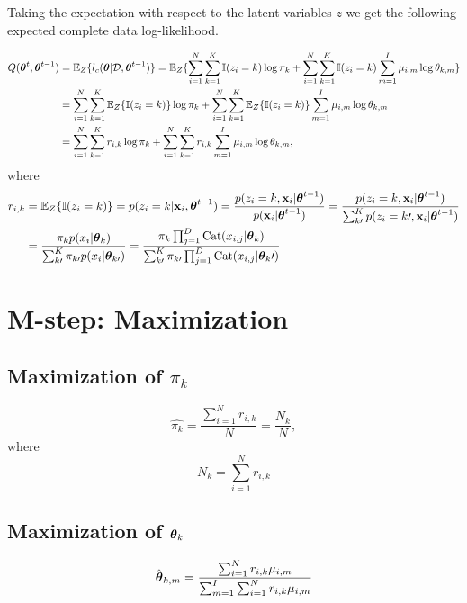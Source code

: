 \documentclass[12pt]{article}
\begin{document}
Taking the expectation with respect to the latent variables $z$ we get the following expected complete data log-likelihood.

\begin{align}
    Q(\boldsymbol\theta^t, \boldsymbol\theta^{t-1}) & = \mathbb{E}_Z\{l_c(\boldsymbol\theta|\mathcal{D},\boldsymbol\theta^{t-1})\} = \mathbb{E}_Z\{\sum_{i=1}^N\sum_{k=1}^K\mathbb{I} (z_i=k) \log \pi_k + \sum_{i=1}^N\sum_{k=1}^K\mathbb{I} (z_i=k) \sum_{m=1}^I \mu_{i,m}\log \theta_{k,m}\}\\
    & = \sum_{i=1}^N\sum_{k=1}^K\mathbb{E}_Z\{\mathbb{I} (z_i=k)\} \log \pi_k + \sum_{i=1}^N\sum_{k=1}^K\mathbb{E}_Z\{\mathbb{I}(z_i=k)\} \sum_{m=1}^I \mu_{i,m}\log \theta_{k,m}\\
    & = \sum_{i=1}^N\sum_{k=1}^K r_{i,k}\log \pi_k + \sum_{i=1}^N\sum_{k=1}^K r_{i,k}\sum_{m=1}^I \mu_{i,m}\log \theta_{k,m} ,
\end{align}
where 
\begin{align}
	r_{i,k} &= \mathbb{E}_Z\{ \mathbb{I}(z_i=k) \} = p(z_i = k|\mathbf{x}_i,\boldsymbol\theta^{t-1}) = \frac{p(z_i=k,\mathbf{x}_i|\boldsymbol\theta^{t-1})}{p(\mathbf{x}_i|\boldsymbol\theta^{t-1})} = \frac{p(z_i=k,\mathbf{x}_i|\boldsymbol\theta^{t-1})}{\sum_{k\prime}^{K}p(z_i=k\prime,\mathbf{x}_i|\boldsymbol\theta^{t-1})}\\
	& = \frac{\pi_k p(x_i|\boldsymbol\theta_k)}{\sum_{k\prime}^K \pi_{k\prime} p(x_i|\boldsymbol\theta_{k\prime})} =
	\frac{\pi_k\prod_{j=1}^{D}\operatorname{\operatorname{Cat}}(x_{i,j}|\boldsymbol\theta_k)}{\sum_{k\prime}^{K} \pi_{k\prime} \prod_{j=1}^{D}\operatorname{\operatorname{Cat}}(x_{i,j}|\boldsymbol\theta_k\prime)}
\end{align}


\section{M-step: Maximization}

\subsection{Maximization of $\pi_k$}


\begin{equation}
	\hat{\pi_k} = \frac{\sum_{i=1}^N r_{i,k}}{N} = \frac{N_k}{N},
\end{equation}
where
\begin{equation}
	N_k = \sum_{i=1}^N r_{i,k}
\end{equation}

\subsection{Maximization of $\boldsymbol\theta_k$}

\begin{equation}
	\hat{\boldsymbol\theta}_{k,m} = \frac{\sum_{i=1}^N r_{i,k}\mu_{i,m}}{\sum_{m=1}^I \sum_{i=1}^N r_{i,k} \mu_{i,m}}
\end{equation}




\nocite{*}
\printbibliography
\end{document}
